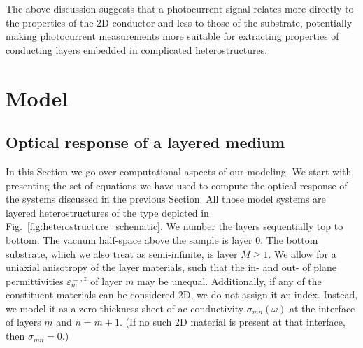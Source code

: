 \documentclass[aps, prb, reprint, superscriptaddress]{revtex4-2}
\begin{document}
The above discussion suggests that a photocurrent signal relates more directly to the properties of the 2D conductor and less to those of the substrate, potentially making photocurrent measurements more suitable for extracting properties of conducting layers embedded in complicated heterostructures. 

\section{Model}
\label{sec:equations}

\subsection{Optical response of a layered medium}
\label{ssec:OR}

In this Section we go over computational aspects of our modeling.
We start with presenting the set of equations we have used to compute the optical response of
the systems discussed in the previous Section.
All those model systems are layered heterostructures of the type depicted in Fig.~\ref{fig:heterostructure_schematic}.
We number the layers sequentially top to bottom.
The vacuum half-space above the sample is layer $0$.
The bottom substrate, which we also treat as semi-infinite, is layer $M \geq 1$.
We allow for a uniaxial anisotropy of the layer materials, such that
the in- and out- of plane permittivities $\varepsilon_{m}^{\perp, z}$ of layer $m$
may be unequal.
Additionally, if any of the constituent materials can be considered 2D, we do not assign it an index.
Instead, we model it as a zero-thickness sheet of ac conductivity $\sigma_{mn}(\omega)$ at the interface of layers $m$ and $n = m + 1$.
(If no such 2D material is present at that interface, then $\sigma_{mn} = 0$.)
\end{document}
